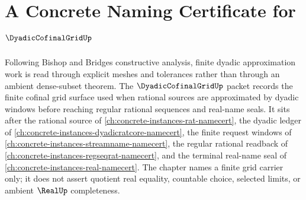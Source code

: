 \chapter{A Concrete Naming Certificate for $\DyadicCofinalGridUp$}
\label{ch:concrete-instances-dyadic-cofinal-grid-namecert}

Following Bishop and Bridges constructive analysis, finite dyadic approximation work is read through explicit meshes and tolerances rather than through an ambient dense-subset theorem. The $\DyadicCofinalGridUp$ packet records the finite cofinal grid surface used when rational sources are approximated by dyadic windows before reaching regular rational sequences and real-name seals. It sits after the rational source of \autoref{ch:concrete-instances-rat-namecert}, the dyadic ledger of \autoref{ch:concrete-instances-dyadicratcore-namecert}, the finite request windows of \autoref{ch:concrete-instances-streamname-namecert}, the regular rational readback of \autoref{ch:concrete-instances-regseqrat-namecert}, and the terminal real-name seal of \autoref{ch:concrete-instances-real-namecert}. The chapter names a finite grid carrier only; it does not assert quotient real equality, countable choice, selected limits, or ambient $\RealUp$ completeness.


